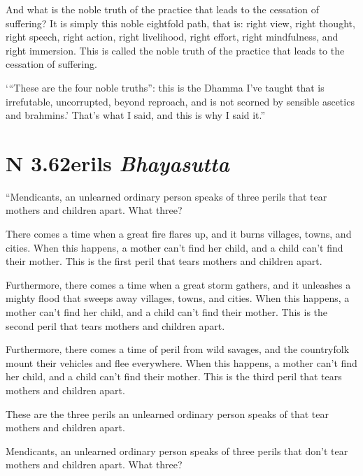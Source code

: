 \documentclass[12pt,openany]{book}%
\newcommand*{\suttatitleacronym}[1]{\smaller[2]{#1}\vspace*{.3em}}
\newcommand*{\suttatitletranslation}[1]{\linebreak{#1}}
\newcommand*{\suttatitleroot}[1]{\linebreak\smaller[2]\itshape{#1}}
\newcommand*{\tocacronym}[1]{\hspace*{-3.3em}{#1}\quad}
\newcommand*{\toctranslation}[1]{#1}
\newcommand*{\tocroot}[1]{(\textit{#1})}
\begin{document}
And what is the noble truth of the practice that leads to the cessation of suffering? It is simply this noble eightfold path, that is: right view, right thought, right speech, right action, right livelihood, right effort, right mindfulness, and right immersion. This is called the noble truth of the practice that leads to the cessation of suffering. 

‘“These are the four noble truths”: this is the Dhamma I’ve taught that is irrefutable, uncorrupted, beyond reproach, and is not scorned by sensible ascetics and brahmins.’ That’s what I said, and this is why I said it.” 

%
\section*{{\suttatitleacronym AN 3.62}{\suttatitletranslation Perils }{\suttatitleroot Bhayasutta}}
\addcontentsline{toc}{section}{\tocacronym{AN 3.62} \toctranslation{Perils } \tocroot{Bhayasutta}}

“Mendicants, an unlearned ordinary person speaks of three perils that tear mothers and children apart. What three? 

There comes a time when a great fire flares up, and it burns villages, towns, and cities. When this happens, a mother can’t find her child, and a child can’t find their mother. This is the first peril that tears mothers and children apart. 

Furthermore, there comes a time when a great storm gathers, and it unleashes a mighty flood that sweeps away villages, towns, and cities. When this happens, a mother can’t find her child, and a child can’t find their mother. This is the second peril that tears mothers and children apart. 

Furthermore, there comes a time of peril from wild savages, and the countryfolk mount their vehicles and flee everywhere. When this happens, a mother can’t find her child, and a child can’t find their mother. This is the third peril that tears mothers and children apart. 

These are the three perils an unlearned ordinary person speaks of that tear mothers and children apart. 

Mendicants, an unlearned ordinary person speaks of three perils that don’t tear mothers and children apart. What three? 
\end{document}
